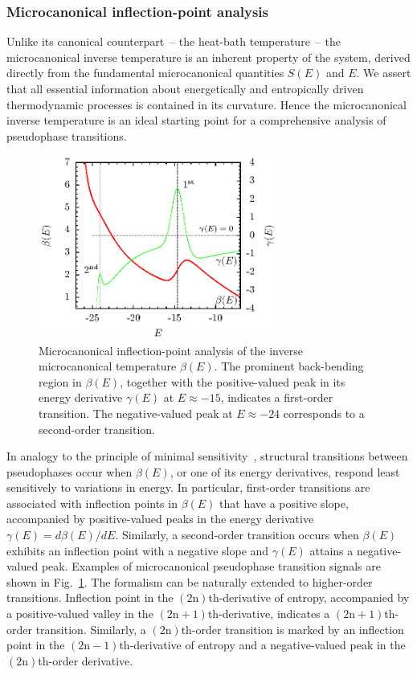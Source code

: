 \documentclass[12pt]{report}
\begin{document}
\subsubsection{Microcanonical inflection-point analysis}
\label{subsubsec:InflectionPointAnalysis}
Unlike its canonical counterpart~-- the heat-bath temperature~-- the
microcanonical inverse temperature is an inherent property of the system, derived directly from the fundamental microcanonical quantities $S(E)$ and $E$. We assert that all essential information about energetically and entropically driven thermodynamic processes is contained in its curvature. Hence the microcanonical inverse temperature is an ideal starting point for a comprehensive analysis of pseudophase transitions\cite{Gross2001}.  

%
\begin{figure}
\center
\includegraphics[width = 0.7\textwidth]{chapter2Figs/MicroAnalysisExample.eps}
\caption{\label{fig:Fig_1}%
Microcanonical inflection-point analysis of the inverse microcanonical temperature $\beta(E)$. The prominent back-bending region in $\beta(E)$, together with the positive-valued peak in its energy derivative $\gamma(E)$ at $E \approx -15$, indicates a first-order transition. The negative-valued peak at $E\approx -24$ corresponds to a second-order transition.}
\end{figure}
%

In analogy to the principle of minimal sensitivity~\cite{Stevenson}, structural transitions between pseudophases occur when $\beta(E)$, or one of its energy
derivatives, respond least sensitively to variations in energy\cite{Schnabel2011}. In particular, first-order transitions are associated with inflection points in $\beta (E)$ that have a positive slope, accompanied by positive-valued peaks in the energy derivative $\gamma(E)=d\beta(E)/dE$. Similarly, a second-order transition occurs when $\beta(E)$ exhibits an inflection point with a negative slope and $\gamma(E)$ attains a negative-valued peak. Examples of microcanonical pseudophase transition signals are shown in Fig.~\ref{fig:Fig_1}. The formalism can be naturally extended to higher-order transitions. Inflection point in the $(2\mathrm{n})$th-derivative of entropy, accompanied by a positive-valued valley in the $(2\mathrm{n}+1)$th-derivative, indicates a $(2\mathrm{n}+1)$th-order transition. Similarly, a $(2\mathrm{n})$th-order transition is marked by an inflection point in the $(2\mathrm{n}-1)$th-derivative of entropy and a negative-valued peak in the $(2\mathrm{n})$th-order derivative.
\end{document}
